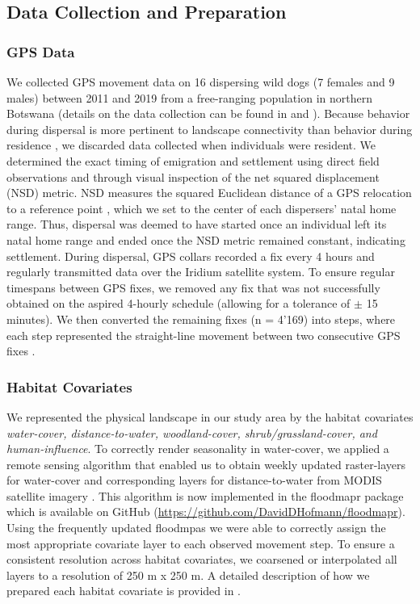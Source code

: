 \documentclass[abstract=on,10pt,a4paper,bibliography=totocnumbered]{article}
\begin{document}
\subsection{Data Collection and Preparation}
\subsubsection{GPS Data}
We collected GPS movement data on 16 dispersing wild dogs (7 females and 9
males) between 2011 and 2019 from a free-ranging population in northern Botswana
(details on the data collection can be found in \cite{Cozzi.2020} and
\cite{Hofmann.2021}). Because behavior during dispersal is more pertinent to
landscape connectivity than behavior during residence \citep{Elliot.2014,
Abrahms.2017}, we discarded data collected when individuals were resident. We
determined the exact timing of emigration and settlement using direct field
observations and through visual inspection of the net squared displacement (NSD)
metric. NSD measures the squared Euclidean distance of a GPS relocation to a
reference point \citep{Borger.2012}, which we set to the center of each
dispersers' natal home range. Thus, dispersal was deemed to have started once an
individual left its natal home range and ended once the NSD metric remained
constant, indicating settlement. During dispersal, GPS collars recorded a fix
every 4 hours and regularly transmitted data over the Iridium satellite system.
To ensure regular timespans between GPS fixes, we removed any fix that was not
successfully obtained on the aspired 4-hourly schedule (allowing for a tolerance
of \( \pm \) 15 minutes). We then converted the remaining fixes (n = 4'169) into
steps, where each step represented the straight-line movement between two
consecutive GPS fixes \citep{Turchin.1998}.

\subsubsection{Habitat Covariates}
We represented the physical landscape in our study area by the habitat
covariates \textit{water-cover, distance-to-water, woodland-cover,
shrub/grassland-cover, and human-influence}. To correctly render seasonality in
water-cover, we applied a remote sensing algorithm that enabled us to obtain
weekly updated raster-layers for water-cover and corresponding layers for
distance-to-water from MODIS satellite imagery \citealp{Wolski.2017,
Hofmann.2021}. This algorithm is now implemented in the \textsf{floodmapr}
package which is available on GitHub
(\url{https://github.com/DavidDHofmann/floodmapr}). Using the frequently updated
floodmpas we were able to correctly assign the most appropriate covariate layer
to each observed movement step. To ensure a consistent resolution across habitat
covariates, we coarsened or interpolated all layers to a resolution of 250 m x
250 m. A detailed description of how we prepared each habitat covariate is
provided in \cite{Hofmann.2021}.
\end{document}
